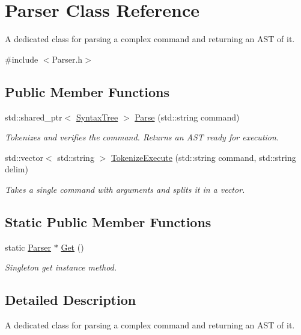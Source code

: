 \hypertarget{classParser}{}\section{Parser Class Reference}
\label{classParser}


A dedicated class for parsing a complex command and returning an A\+ST of it.  




{\ttfamily \#include $<$Parser.\+h$>$}

\subsection*{Public Member Functions}
\begin{DoxyCompactItemize}
\item 
std\+::shared\+\_\+ptr$<$ \hyperlink{structSyntaxTree}{Syntax\+Tree} $>$ \hyperlink{classParser_ac45f30e3cfa787cece390bb80cee7fd0}{Parse} (std\+::string command)
\begin{DoxyCompactList}\small\item\em Tokenizes and verifies the command. Returns an A\+ST ready for execution. \end{DoxyCompactList}\item 
std\+::vector$<$ std\+::string $>$ \hyperlink{classParser_acabb9fe9da6646d4d411c50e7fa50c08}{Tokenize\+Execute} (std\+::string command, std\+::string delim)
\begin{DoxyCompactList}\small\item\em Takes a single command with arguments and splits it in a vector. \end{DoxyCompactList}\end{DoxyCompactItemize}
\subsection*{Static Public Member Functions}
\begin{DoxyCompactItemize}
\item 
static \hyperlink{classParser}{Parser} $\ast$ \hyperlink{classParser_a6177e907d92d35de545d44d10a23bc07}{Get} ()
\begin{DoxyCompactList}\small\item\em Singleton get instance method. \end{DoxyCompactList}\end{DoxyCompactItemize}


\subsection{Detailed Description}
A dedicated class for parsing a complex command and returning an A\+ST of it. 

